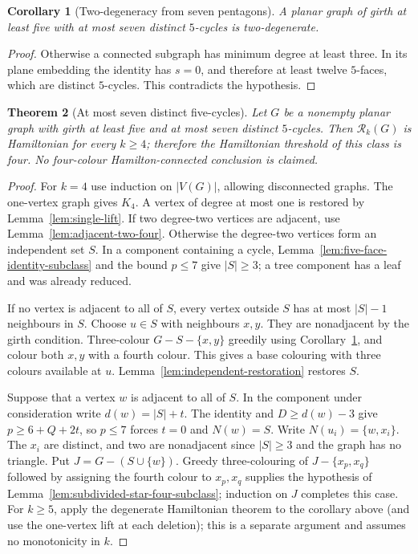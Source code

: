 \documentclass[11pt]{article}
\newtheorem{theorem}{Theorem}[section]
\newtheorem{corollary}[theorem]{Corollary}
\theoremstyle{remark}
\newcommand{\Rk}{\mathcal R_k}
\numberwithin{equation}{section}
\numberwithin{table}{section}
\begin{document}
\begin{corollary}[Two-degeneracy from seven pentagons]
\label{cor:seven-pentagons-two-degenerate}
A planar graph of girth at least five with at most seven distinct $5$-cycles
is two-degenerate.
\end{corollary}

\begin{proof}
Otherwise a connected subgraph has minimum degree at least three.  In its
plane embedding the identity has $s=0$, and therefore at least twelve
$5$-faces, which are distinct $5$-cycles.  This contradicts the hypothesis.
\end{proof}

\begin{theorem}[At most seven distinct five-cycles]
\label{thm:seven-pentagons}
Let $G$ be a nonempty planar graph with girth at least five and at most
seven distinct $5$-cycles.  Then $\Rk(G)$ is Hamiltonian for every $k\ge4$;
therefore the Hamiltonian threshold of this class is four.  No
four-colour Hamilton-connected conclusion is claimed.
\end{theorem}

\begin{proof}
For $k=4$ use induction on $|V(G)|$, allowing disconnected graphs.  The
one-vertex graph gives $K_4$.  A vertex of degree at most one is restored by
Lemma~\ref{lem:single-lift}.  If two degree-two vertices are adjacent, use
Lemma~\ref{lem:adjacent-two-four}.  Otherwise the degree-two
vertices form an independent set $S$.  In a component containing a cycle,
Lemma~\ref{lem:five-face-identity-subclass} and the bound $p\le7$ give
$|S|\ge3$; a tree component has a leaf and was already reduced.

If no vertex is adjacent to all of $S$, every vertex outside $S$ has at most
$|S|-1$ neighbours in $S$.  Choose $u\in S$ with neighbours $x,y$.  They are
nonadjacent by the girth condition.  Three-colour $G-S-\{x,y\}$ greedily
using Corollary~\ref{cor:seven-pentagons-two-degenerate}, and colour both
$x,y$ with a fourth colour.  This gives a base colouring with three colours
available at $u$.  Lemma~\ref{lem:independent-restoration} restores $S$.

Suppose that a vertex $w$ is adjacent to all of $S$.  In the component under
consideration write $d(w)=|S|+t$.  The identity and
$D\ge d(w)-3$ give $p\ge6+Q+2t$, so $p\le7$ forces $t=0$ and
$N(w)=S$.  Write $N(u_i)=\{w,x_i\}$.  The $x_i$ are distinct, and two are
nonadjacent since $|S|\ge3$ and the graph has no triangle.  Put
$J=G-(S\cup\{w\})$.  Greedy three-colouring of $J-\{x_p,x_q\}$ followed by
assigning the fourth colour to $x_p,x_q$ supplies the hypothesis of
Lemma~\ref{lem:subdivided-star-four-subclass}; induction on $J$ completes
this case.  For $k\ge5$, apply the degenerate Hamiltonian theorem to the
corollary above (and use the one-vertex lift at each deletion); this is a
separate argument and assumes no monotonicity in $k$.
\end{proof}
\end{document}
